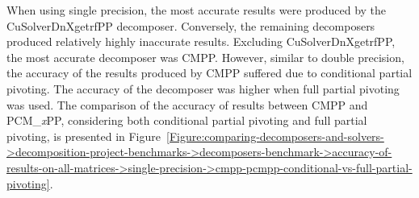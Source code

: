 When using single precision, the most accurate results were produced by the CuSolverDnXgetrfPP decomposer.
Conversely, the remaining decomposers produced relatively highly inaccurate results.
Excluding CuSolverDnXgetrfPP, the most accurate decomposer was CMPP.
However, similar to double precision, the accuracy of the results produced by CMPP suffered due to conditional partial pivoting.
The accuracy of the decomposer was higher when full partial pivoting was used.
The comparison of the accuracy of results between CMPP and PCM\_\textit{x}PP, considering both conditional partial pivoting and full partial pivoting, is presented in Figure~\ref{Figure:comparing-decomposers-and-solvers->decomposition-project-benchmarks->decomposers-benchmark->accuracy-of-results-on-all-matrices->single-precision->cmpp-pcmpp-conditional-vs-full-partial-pivoting}.

